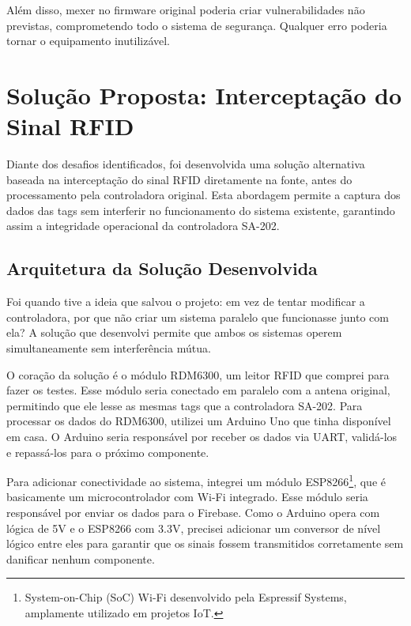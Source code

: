 Além disso, mexer no firmware original poderia criar vulnerabilidades não previstas, comprometendo todo o sistema de segurança. Qualquer erro poderia tornar o equipamento inutilizável. 

\section{Solução Proposta: Interceptação do Sinal RFID}
\label{sec:solucao-proposta}

Diante dos desafios identificados, foi desenvolvida uma solução alternativa baseada na interceptação do sinal RFID diretamente na fonte, antes do processamento pela controladora original. Esta abordagem permite a captura dos dados das tags sem interferir no funcionamento do sistema existente, garantindo assim a integridade operacional da controladora SA-202.

\subsection{Arquitetura da Solução Desenvolvida}

Foi quando tive a ideia que salvou o projeto: em vez de tentar modificar a controladora, por que não criar um sistema paralelo que funcionasse junto com ela? A solução que desenvolvi permite que ambos os sistemas operem simultaneamente sem interferência mútua. 

O coração da solução é o módulo RDM6300, um leitor RFID que comprei para fazer os testes. Esse módulo seria conectado em paralelo com a antena original, permitindo que ele lesse as mesmas tags que a controladora SA-202. Para processar os dados do RDM6300, utilizei um Arduino Uno que tinha disponível em casa. O Arduino seria responsável por receber os dados via UART, validá-los e repassá-los para o próximo componente.

Para adicionar conectividade ao sistema, integrei um módulo ESP8266\footnote{System-on-Chip (SoC) Wi-Fi desenvolvido pela Espressif Systems, amplamente utilizado em projetos IoT.}, que é basicamente um microcontrolador com Wi-Fi integrado. Esse módulo seria responsável por enviar os dados para o Firebase. Como o Arduino opera com lógica de 5V e o ESP8266 com 3.3V, precisei adicionar um conversor de nível lógico entre eles para garantir que os sinais fossem transmitidos corretamente sem danificar nenhum componente.

